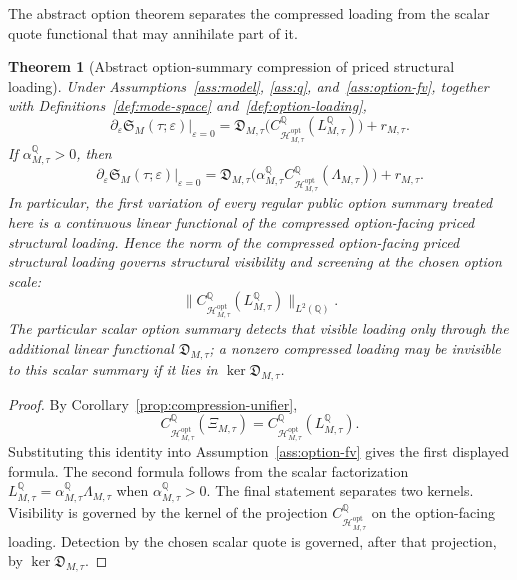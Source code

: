 \documentclass[11pt,a4paper]{amsart}
\theoremstyle{plain}
\newtheorem{theorem}{Theorem}[section]
\theoremstyle{definition}
\theoremstyle{remark}
\newcommand{\QQ}{\mathbb{Q}}
\newcommand{\cH}{\mathcal{H}}
\begin{document}
The abstract option theorem separates the compressed loading from the scalar quote functional that
may annihilate part of it.

\begin{theorem}[Abstract option-summary compression of priced structural loading]\label{thm:option-abstract}
Under Assumptions~\ref{ass:model}, \ref{ass:q}, and~\ref{ass:option-fv}, together with
Definitions~\ref{def:mode-space} and~\ref{def:option-loading},
\[
        \partial_\varepsilon \mathfrak S_M(\tau;\varepsilon)\big|_{\varepsilon=0}
        =
        \mathfrak D_{M,\tau}
        \bigl(C_{\cH_{M,\tau}^{\mathrm{opt}}}^\QQ(L_{M,\tau}^\QQ)\bigr)
        +
        r_{M,\tau}.
\]
If \(\alpha_{M,\tau}^\QQ>0\), then
\[
        \partial_\varepsilon \mathfrak S_M(\tau;\varepsilon)\big|_{\varepsilon=0}
        =
        \mathfrak D_{M,\tau}
        \bigl(
                \alpha_{M,\tau}^\QQ
                C_{\cH_{M,\tau}^{\mathrm{opt}}}^\QQ(\Lambda_{M,\tau})
        \bigr)
        +
        r_{M,\tau}.
\]
In particular, the first variation of every regular public option summary treated here is
a continuous linear functional of the compressed option-facing priced structural loading.  Hence
the norm of the compressed option-facing priced structural loading governs structural visibility
and screening at the chosen option scale:
\[
        \|C_{\cH_{M,\tau}^{\mathrm{opt}}}^\QQ(L_{M,\tau}^\QQ)\|_{L^2(\QQ)}.
\]
The particular scalar option summary detects that visible loading only through the additional
linear functional \(\mathfrak D_{M,\tau}\); a nonzero compressed loading may be invisible to this
scalar summary if it lies in \(\ker\mathfrak D_{M,\tau}\).
\end{theorem}

\begin{proof}
By Corollary~\ref{prop:compression-unifier},
\[
        C_{\cH_{M,\tau}^{\mathrm{opt}}}^\QQ(\Xi_{M,\tau})
        =
        C_{\cH_{M,\tau}^{\mathrm{opt}}}^\QQ(L_{M,\tau}^\QQ).
\]
Substituting this identity into Assumption~\ref{ass:option-fv} gives the first displayed formula.
The second formula follows from the scalar factorization
\(
        L_{M,\tau}^\QQ=\alpha_{M,\tau}^\QQ\Lambda_{M,\tau}
\)
when \(\alpha_{M,\tau}^\QQ>0\).  The final statement separates two kernels.  Visibility is governed
by the kernel of the projection \(C_{\cH_{M,\tau}^{\mathrm{opt}}}^\QQ\) on the option-facing loading.
Detection by the chosen scalar quote is governed, after that projection, by
\(\ker\mathfrak D_{M,\tau}\).
\end{proof}
\end{document}
